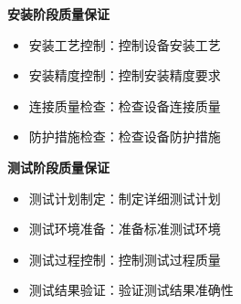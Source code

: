 \documentclass[UTF8,a4paper,zihao=-4]{ctexart}
\begin{document}
\textbf{安装阶段质量保证}
\begin{itemize}
    \item 安装工艺控制：控制设备安装工艺
    \item 安装精度控制：控制安装精度要求
    \item 连接质量检查：检查设备连接质量
    \item 防护措施检查：检查设备防护措施
\end{itemize}

\textbf{测试阶段质量保证}
\begin{itemize}
    \item 测试计划制定：制定详细测试计划
    \item 测试环境准备：准备标准测试环境
    \item 测试过程控制：控制测试过程质量
    \item 测试结果验证：验证测试结果准确性
\end{itemize}
\end{document}
